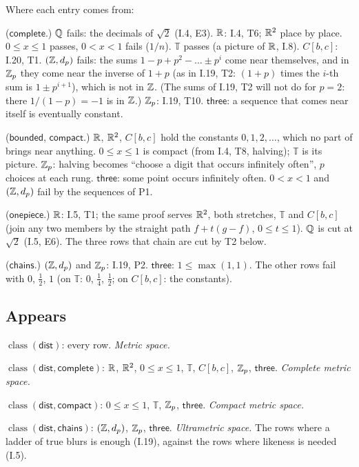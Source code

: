 Where each entry comes from:
\begin{lines}
\item[\lab{P1}] ($\mathsf{complete}$.) $\mathbb{Q}$ fails: the decimals of $\sqrt2$ (I.4, E3). $\mathbb{R}$: I.4, T6; $\mathbb{R}^2$ place by place. $0 \le x \le 1$ passes, $0 < x < 1$ fails ($1/n$). $\mathbb{T}$ passes (a picture of $\mathbb{R}$, I.8). $C[b,c]$: I.20, T1. $(\mathbb{Z}, d_p)$ fails: the sums $1 - p + p^2 - \dots \pm p^i$ come near themselves, and in $\mathbb{Z}_p$ they come near the inverse of $1 + p$ (as in I.19, T2: $(1 + p)$ times the $i$-th sum is $1 \pm p^{i+1}$), which is not in $\mathbb{Z}$. (The sums of I.19, T2 will not do for $p = 2$: there $1/(1 - p) = -1$ is in $\mathbb{Z}$.) $\mathbb{Z}_p$: I.19, T10. $\mathsf{three}$: a sequence that comes near itself is eventually constant.
\item[\lab{P2}] ($\mathsf{bounded}$, $\mathsf{compact}$.) $\mathbb{R}$, $\mathbb{R}^2$, $C[b,c]$ hold the constants $0, 1, 2, \dots$, which no part of brings near anything. $0 \le x \le 1$ is compact (from I.4, T8, halving); $\mathbb{T}$ is its picture. $\mathbb{Z}_p$: halving becomes ``choose a digit that occurs infinitely often'', $p$ choices at each rung. $\mathsf{three}$: some point occurs infinitely often. $0 < x < 1$ and $(\mathbb{Z}, d_p)$ fail by the sequences of P1.
\item[\lab{P3}] ($\mathsf{onepiece}$.) $\mathbb{R}$: I.5, T1; the same proof serves $\mathbb{R}^2$, both stretches, $\mathbb{T}$ and $C[b,c]$ (join any two members by the straight path $f + t(g - f)$, $0 \le t \le 1$). $\mathbb{Q}$ is cut at $\sqrt2$ (I.5, E6). The three rows that chain are cut by T2 below.
\item[\lab{P4}] ($\mathsf{chains}$.) $(\mathbb{Z}, d_p)$ and $\mathbb{Z}_p$: I.19, P2. $\mathsf{three}$: $1 \le \max(1, 1)$. The other rows fail with $0$, $\tfrac12$, $1$ (on $\mathbb{T}$: $0$, $\tfrac14$, $\tfrac12$; on $C[b,c]$: the constants).
\end{lines}

\subsection*{Appears}

\begin{lines}
\item[\lab{N1}] $\operatorname{class}(\mathsf{dist})$: every row. \emph{Metric space.}
\item[\lab{N2}] $\operatorname{class}(\mathsf{dist}, \mathsf{complete})$: $\mathbb{R}$, $\mathbb{R}^2$, $0 \le x \le 1$, $\mathbb{T}$, $C[b,c]$, $\mathbb{Z}_p$, $\mathsf{three}$. \emph{Complete metric space.}
\item[\lab{N3}] $\operatorname{class}(\mathsf{dist}, \mathsf{compact})$: $0 \le x \le 1$, $\mathbb{T}$, $\mathbb{Z}_p$, $\mathsf{three}$. \emph{Compact metric space.}
\item[\lab{N4}] $\operatorname{class}(\mathsf{dist}, \mathsf{chains})$: $(\mathbb{Z}, d_p)$, $\mathbb{Z}_p$, $\mathsf{three}$. \emph{Ultrametric space.} The rows where a ladder of true blurs is enough (I.19), against the rows where likeness is needed (I.5).
\end{lines}

